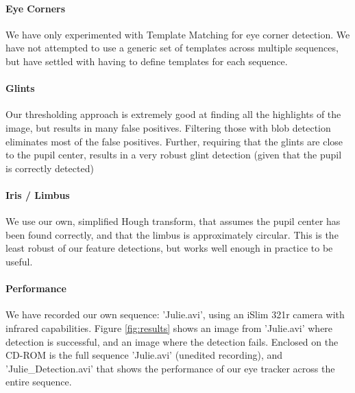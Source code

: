 \documentclass[a4paper,11pt]{article}
\begin{document}
\paragraph{Eye Corners}
We have only experimented with Template Matching for eye corner detection. We have not attempted to use a generic set of templates across multiple sequences, but have settled with having to define templates for each sequence.

\paragraph{Glints}
Our thresholding approach is extremely good at finding all the highlights of the image, but results in many false positives. Filtering those with blob detection eliminates most of the false positives. Further, requiring that the glints are close to the pupil center, results in a very robust glint detection (given that the pupil is correctly detected)

\paragraph{Iris / Limbus}
We use our own, simplified Hough transform, that assumes the pupil center has been found correctly, and that the limbus is approximately circular. This is the least robust of our feature detections, but works well enough in practice to be useful.

\paragraph{Performance}
We have recorded our own sequence: 'Julie.avi', using an iSlim 321r camera with infrared capabilities. Figure \ref{fig:results} shows an image from 'Julie.avi' where detection is successful, and an image where the detection fails. Enclosed on the CD-ROM is the full sequence 'Julie.avi' (unedited recording), and 'Julie\_Detection.avi' that shows the performance of our eye tracker across the entire sequence. \\
\end{document}
